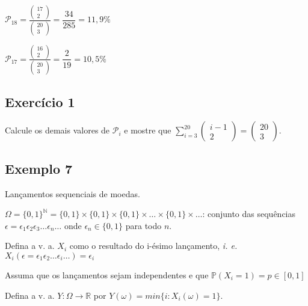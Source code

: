 \documentclass[a4paper]{article}
\begin{document}
	$\mathcal{P}_{18} = \frac{\begin{pmatrix}
		17 \\
		2
		\end{pmatrix}}{\begin{pmatrix}
		20 \\
		3
		\end{pmatrix}} = \dfrac{34}{285} = 11,9\%$
	
	$\mathcal{P}_{17} = \frac{\begin{pmatrix}
		16 \\
		2
		\end{pmatrix}}{\begin{pmatrix}
		20 \\
		3
		\end{pmatrix}} = \dfrac{2}{19} = 10,5\%$
	
	\subsection{Exercício 1}
	
	\noindent Calcule os demais valores de $\mathcal{P}_{i}$ e mostre que $\sum_{i=3}^{20} \begin{pmatrix}
	i-1 \\
	2
	\end{pmatrix} = \begin{pmatrix}
	20 \\
	3
	\end{pmatrix}$.
	
	\subsection{Exemplo 7}
	
	\noindent Lançamentos sequenciais de moedas.
	
	$\varOmega = \{0,1\}^{\mathbb{N}} = \{0,1\} \times \{0,1\} \times \{0,1\} \times \dots \times \{0,1\} \times \dots$: conjunto das sequências $\epsilon = \epsilon_{1} \epsilon_{2} \epsilon_{3} \dots \epsilon_{n} \dots$ onde $\epsilon_{n} \in \{0,1\}$ para todo $n$.
	
	\noindent Defina a v. a. $X_{i}$ como o resultado do i-ésimo lançamento, \textit{i. e.} $X_{i}(\epsilon = \epsilon_{1} \epsilon_{2} \dots \epsilon_{i} \dots) = \epsilon_{i}$
	
	\noindent Assuma que os lançamentos sejam independentes e que $\boxed{\mathbb{P}(X_{i}=1) = p \in [0,1]}$
	
	\noindent Defina a v. a. $Y: \varOmega \rightarrow \mathbb{R}$ por $Y(\omega) = min \{i:X_{i}(\omega)=1\}$.
	
\end{document}
